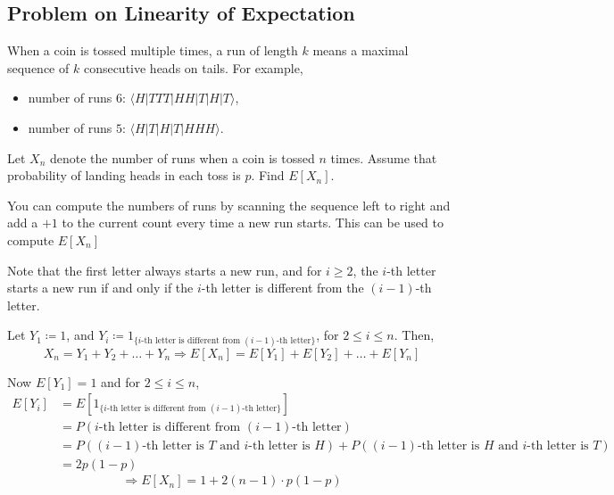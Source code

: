 \subsection{Problem on Linearity of Expectation}
\begin{example}
    When a coin is tossed multiple times, a run of length $k$ means a maximal
sequence of $k$ consecutive heads on tails. For example,
\begin{itemize}[noitemsep, topsep=0em]
    \item number of runs $6$: $\langle H \vert TTT \vert HH \vert T \vert H
          \vert T \rangle$,
    \item number of runs $5$: $\langle H \vert T \vert H \vert T \vert HHH
          \rangle$.
\end{itemize} 
    Let $X_n$ denote the number of runs when a coin is tossed $n$ times. Assume
that probability of landing heads in each toss is $p$. Find $E[X_n]$.
\end{example}

\note You can compute the numbers of runs by scanning the sequence left to
right and add a $+1$ to the current count every time a new run starts. This can
be used to compute $E[X_n]$

\begin{solution}
    Note that the first letter always starts a new run, and for $i \geq 2$, the
$i$-th letter starts a new run if and only if the $i$-th letter is different
from the $(i - 1)$-th letter. 

    Let $Y_1 \coloneqq 1$, and $Y_i \coloneqq 1_{\lbrace i\text{-th letter is
different from }(i - 1)\text{-th letter} \rbrace}$, for $2 \leq i \leq n$.
Then, 
    \[ X_n = Y_1 + Y_2 + \dots + Y_n
       \Rightarrow E[X_n] = E[Y_1] + E[Y_2] + \dots + E[Y_n]                 \]
    
    Now $E[Y_1] = 1$ and for $2 \leq i \leq n$, 
    \begin{align*}
        E[Y_i] &= E[1_{\lbrace \text{$i$-th letter is different from $(i -
                  1)$-th letter} \rbrace}]                                   \\
               &= P(\text{$i$-th letter is different from $(i - 1)$-th 
                  letter})                                                   \\
               &= P(\text{$(i-1)$-th letter is $T$ and $i$-th letter is $H$})+
                  P(\text{$(i-1)$-th letter is $H$ and $i$-th letter is $T$})\\
               &= 2p(1 - p)
    \end{align*}
    \[ \Rightarrow E[X_n] = 1 + 2 (n - 1) \cdot p( 1 - p)                    \]
\end{solution}